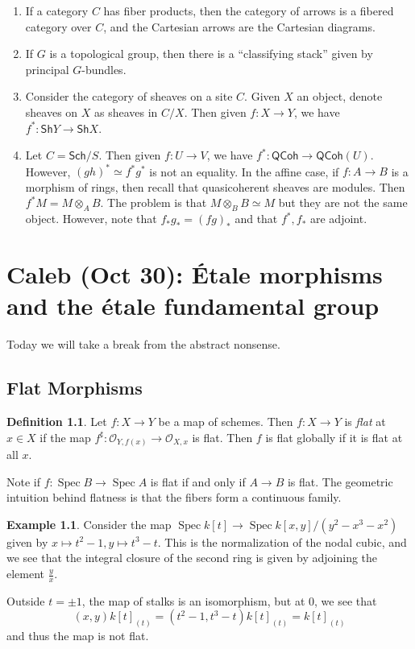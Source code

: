 \documentclass[leqno, openany]{memoir}
\theoremstyle{definition}
\newtheorem{defn}[thm]{Definition}
\newtheorem{exm}[thm]{Example}
\theoremstyle{remark}
\theoremstyle{plain}
\theoremstyle{definition}
\theoremstyle{remark}
\newcommand{\mc}[1]{\mathcal{#1}}
\newcommand{\ms}[1]{\mathsf{#1}}
\DeclareMathOperator{\Spec}{Spec}
\begin{document}
\begin{enumerate} \item If a category $C$ has fiber products, then the category
    of arrows is a fibered category over $C$, and the Cartesian arrows are the
    Cartesian diagrams.  \item If $G$ is a topological group, then there is a
    ``classifying stack'' given by principal $G$-bundles.  \item Consider the
    category of sheaves on a site $C$. Given $X$ an object, denote sheaves on
    $X$ as sheaves in $C / X$. Then given $f \colon X \to Y$, we have $f^*
    \colon \ms{Sh}Y \to \ms{Sh}X$.  \item Let $C = \ms{Sch}/S$. Then given $f
    \colon U \to V$, we have $f^* \colon \ms{QCoh} \to \ms{QCoh}(U)$. However,
    $(gh)^* \simeq f^* g^*$ is not an equality. In the affine case, if $f
    \colon A \to B$ is a morphism of rings, then recall that quasicoherent
    sheaves are modules. Then $f^*M = M \otimes_A B$. The problem is that $M
    \otimes_B B \simeq M$ but they are not the same object. However, note that
    $f_* g_* = (fg)_*$ and that $f^*,f_*$ are adjoint.  \end{enumerate}

\chapter{Caleb (Oct 30): \'Etale morphisms and the \'etale fundamental group}%
\label{cha:caleb_oct_30_'etale_morphisms_and_the_'etale_fundamental_group}

Today we will take a break from the abstract nonsense.

\section{Flat Morphisms}%

\begin{defn} Let $f \colon X \to Y$ be a map of schemes. Then $f \colon X \to
Y$ is \textit{flat} at $x \in X$ if the map $f^{\sharp} \colon \mc{O}_{Y, f(x)}
\to \mc{O}_{X,x}$ is flat. Then $f$ is flat globally if it is flat at all $x$.
\end{defn}

Note if $f \colon \Spec B \to \Spec A$ is flat if and only if $A \to B$ is
flat. The geometric intuition behind flatness is that the fibers form a
continuous family.

\begin{exm} Consider the map $\Spec k[t] \to \Spec k[x,y] / (y^2 - x^3 - x^2)$
    given by $x \mapsto t^2-1, y \mapsto t^3-t$. This is the normalization of
    the nodal cubic, and we see that the integral closure of the second ring is
    given by adjoining the element $\frac{y}{x}$.

    Outside $t = \pm 1$, the map of stalks is an isomorphism, but at $0$, we
    see that \[ (x,y) k[t]_{(t)} = (t^2 - 1, t^3-t) k[t]_{(t)} = k[t]_{(t)} \]
and thus the map is not flat.  \end{exm}
\end{document}
